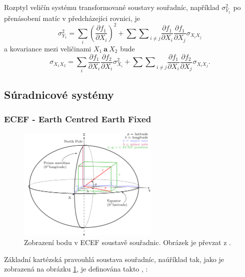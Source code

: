 \documentclass[11pt,a4paper]{article}
\begin{document}
Rozptyl veličín systému transformované soustavy souřadníc, například $\sigma_{Y_{1}}^{2}$ po přenásobení matíc v předcházejíci rovnici, je 
\begin{equation}
\sigma_{Y_{1}}^{2} = \sum_{i}\left(\dfrac{\partial f_{1}}{\partial X_{i}}\right)^{2} + {\sum\sum}_{i\neq j}\dfrac{\partial f_{1}}{\partial X_{i}}\dfrac{\partial f_{1}}{\partial X_{j}}\sigma_{X_{i}X_{j}}
\end{equation}
a kovariance mezi veličinami $X_{1}\ \textbf{a}\ X_{2}$ bude
\begin{equation}
\sigma_{X_{1}X_{2}} = \sum_{i} {\dfrac{\partial f_{1}}{\partial X_{i}}\dfrac{\partial f_{2}}{\partial X_{i}}\sigma_{X_{i}}^{2}} + {\sum\sum}_{i\neq j}\dfrac{\partial f_{1}}{\partial X_{i}}\dfrac{\partial f_{2}}{\partial X_{j}}\sigma_{X_{i}X_{j}}.
\end{equation}

\newpage
\subsection{Súradnicové systémy}


\subsubsection{ECEF - Earth Centred Earth Fixed}

\begin{figure}[ht!]
\begin{center}

\includegraphics[width=0.60\textwidth]{FIG/ecef_wiki}
\caption{Zobrazení bodu v ECEF soustavě souřadnic. Obrázek je převzat z \cite{ecefWiki}.}
\label{fig:ecef}
\end{center}
\end{figure}

Základní kartézská pravouhlá soustava souřadníc, naúříklad tak, jako je zobrazená na obrázku \ref{fig:ecef}, je definována takto \cite{Soler1988}, \cite{Kovar2016}:
\end{document}
